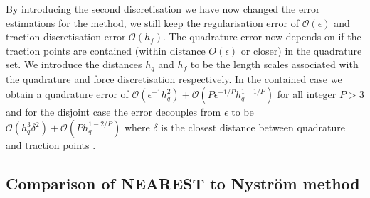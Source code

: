 By introducing the second discretisation we have now changed the error estimations for the method, we still keep the regularisation error of $\mathcal{O}(\epsilon)$ and traction discretisation error $\mathcal{O}(h_f)$. The quadrature error now depends on if the traction points are contained (within distance $O(\epsilon)$ or closer) in the quadrature set. We introduce the distances $h_q$ and $h_f$ to be the length scales associated with the quadrature and force discretisation respectively. In the contained case we obtain a quadrature error of $\mathcal{O}(\epsilon^{-1}h^2_q) + \mathcal{O}(P\epsilon^{-1/P}h^{1-1/P}_q)$ for all integer $P>3$ and for the disjoint case the error decouples from $\epsilon$ to be $\mathcal{O}(h^3_q\delta^{2}) + \mathcal{O}(Ph^{1-2/P}_q)$ where $\delta$ is the closest distance between quadrature and traction points \cite{Gallagher2019SharpEquation}.

\subsection{Comparison of NEAREST to Nyström method}